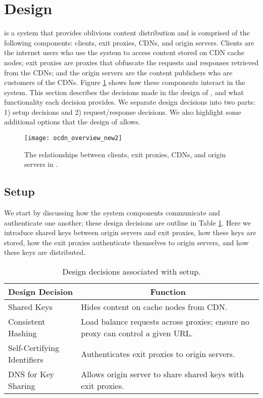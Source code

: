 \section{Design}
\label{sec:design}
\system{} is a system that provides oblivious content distribution and is 
comprised of the following components: clients, exit proxies, CDNs, and origin 
servers.  Clients are the internet users who use the system to access content 
stored on CDN cache nodes; exit proxies are proxies that obfuscate the requests 
and responses retrieved from the CDNs; and the origin servers are the content 
publishers who are customers of the CDNs.  Figure \ref{fig:ocd_overview} shows how
these components interact in the system.  This section describes the decisions 
made in the design of \system{}, and what functionality each decision provides.  
We separate design decisions into two parts: 1) setup decisions and 2) request/response 
decisions.  We also highlight some additional options that the design of 
\system{} allows.

\begin{figure}[t!]
\centering
\texttt{[image: ocdn\_overview\_new2]}
\caption{The relationships between clients, exit proxies, CDNs, and origin servers in 
\system{}.}
\label{fig:ocd_overview}
\end{figure}

\subsection{\system{} Setup}
We start by discussing how the system components communicate and authenticate 
one another; these design decisions are outline in Table \ref{tab:setup}.  Here
we introduce shared keys between origin servers and exit proxies, how these keys are 
stored, how the exit proxies authenticate themselves to origin servers, and how these 
keys are distributed.

\begin{table}[t!]
\footnotesize
\centering
\begin{tabular}{ l  p{2in} } 
 \multicolumn{1}{c}{\bf Design Decision} & \multicolumn{1}{c}{\bf Function} \\
\hline \hline
 Shared Keys & {Hides content on cache nodes from CDN.} \\
 Consistent Hashing & {Load balance requests across proxies; ensure no proxy can
 control a given URL.} \\
 Self-Certifying Identifiers & {Authenticates exit proxies to origin servers.} \\
 DNS for Key Sharing & {Allows origin server to share shared keys with exit
 proxies.} \\ \hline
\end{tabular}
\caption{Design decisions associated with \system{} setup.}
\label{tab:setup}
\end{table}

